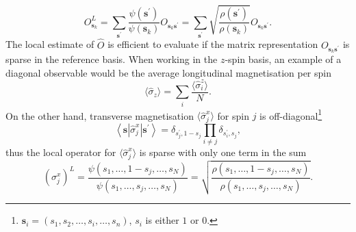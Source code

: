 \begin{equation}
	O_{\boldsymbol{s}_{k}}^{L}=\sum_{\boldsymbol{s}^{\prime}} \frac{\psi(\boldsymbol{s}^{\prime})}{\psi\left(\boldsymbol{s}_{k}\right)} O_{\boldsymbol{s}_{k} \boldsymbol{s}^{\prime}} = \sum_{\boldsymbol{s}^{\prime}} \sqrt{\frac{\rho(\boldsymbol{s}^{\prime})}{\rho\left(\boldsymbol{s}_{k}\right)}} O_{\boldsymbol{s}_{k} \boldsymbol{s}^{\prime}}. 
\end{equation}
The local estimate of $\hat{O}$ is efficient to evaluate if the matrix representation $O_{\boldsymbol{s}_{k} \boldsymbol{s}^{\prime}}$ is sparse in the reference basis. When working in the $z$-spin basis, an example of a diagonal observable would be the average longitudinal magnetisation per spin 
\begin{equation}
	\langle \hat \sigma_z \rangle = \sum_i \frac{\langle \hat \sigma^z_{i} \rangle}{N}.
\end{equation}
On the other hand, transverse magnetisation $\langle \hat \sigma^x_j \rangle$ for spin $j$ is off-diagonal\footnote{$\boldsymbol{s}_i = (s_1, s_2, \ldots, s_i, \ldots, s_n)$, $s_i$ is either $1$ or $0$.}
\begin{equation}
	\left\langle\boldsymbol{s}\left|\hat{\sigma}_{j}^{x}\right| \boldsymbol{s}^{\prime}\right\rangle=\delta_{s_{j}^{\prime}, 1-s_{j}} \prod_{i \neq j} \delta_{s_{i}^{\prime}, s_{j}},
\end{equation}
thus the local operator for $\langle \hat \sigma^x_j \rangle$ is sparse with only one term in the sum
\begin{equation}
	\left(\sigma_{j}^{x}\right)^{L}=\frac{\psi \left(s_{1}, \ldots, 1-s_{j}, \ldots, s_{N}\right)}{\psi\left(s_{1}, \ldots, s_{j}, \ldots, s_{N}\right)}=\sqrt{\frac{\rho \left(s_{1}, \ldots, 1-s_{j}, \ldots, s_{N}\right)}{\rho\left(s_{1}, \ldots, s_{j}, \ldots, s_{N}\right)}}.
\end{equation}

